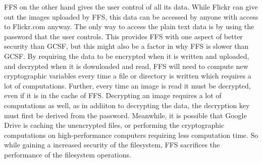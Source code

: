 \gls{FFS} on the other hand gives the user control of all its data. While Flickr can give out the images uploaded by \gls{FFS}, this data can be accessed by anyone with access to Flickr.com anyway. The only way to access the plain text data is by using the password that the user controls. This provides \gls{FFS} with one aspect of better security than \gls{GCSF}, but this might also be a factor in why \gls{FFS} is slower than \gls{GCSF}. By requiring the data to be encrypted when it is written and uploaded, and decrypted when it is downloaded and read, \gls{FFS} will need to compute new cryptographic variables every time a file or directory is written which requires a lot of computations. Further, every time an image is read it must be decrypted, even if it is in the cache of \gls{FFS}. Decrypting an image requires a lot of computations as well, as in addiiton to decrypting the data, the decryption key must first be derived from the password. Meanwhile, it is possible that Google Drive is caching the unencrypted files, or performing the cryptographic computations on \mbox{high-performance} computers requiring less computation time. So while gaining a increased security of the filesystem, \gls{FFS} sacrifices the performance of the filesystem operations.

